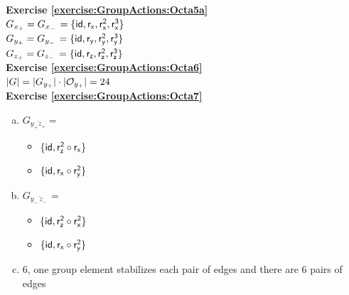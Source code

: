 \noindent\textbf{Exercise \ref{exercise:GroupActions:Octa5a}}
\\
\bigskip
$G_{x_+} = G_{x_-\,} = \{\sf{id}, r_x, r_x^2, r_x^3\}$
\\
\bigskip
$G_{y_+} = G_{y_-\,} = \{\sf{id}, r_y, r_y^2, r_y^3\}$
\\
$G_{z_+} = G_{z_-\,} = \{\sf{id}, r_z, r_z^2, r_z^3\}$
\\

\noindent\textbf{Exercise \ref{exercise:GroupActions:Octa6}}
\\
$|G| = | G_{y_+}| \cdot |{\cal O}_{y_+}| = 24$
\\

\noindent\textbf{Exercise \ref{exercise:GroupActions:Octa7}}
\begin{enumerate}[(a)]
\item
$G_{\overline{y_+z_+}} =$
	\begin{itemize}
	\item
	$\{\sf{id}, r_z^2 \circ r_x\}$
	
	\item
	$\{\sf{id}, r_x \circ r_y^2\}$
	\end{itemize}
	
\item
$G_{\overline{y_-\,z_-\,}} =$
	\begin{itemize}
	\item
	$\{\sf{id}, r_z^2 \circ r_x^2\}$
	
	\item
	$\{\sf{id}, r_x \circ r_y^2\}$
	\end{itemize}
	
\item
6, one group element stabilizes each pair of edges and there are 6 pairs of edges
\end{enumerate}

